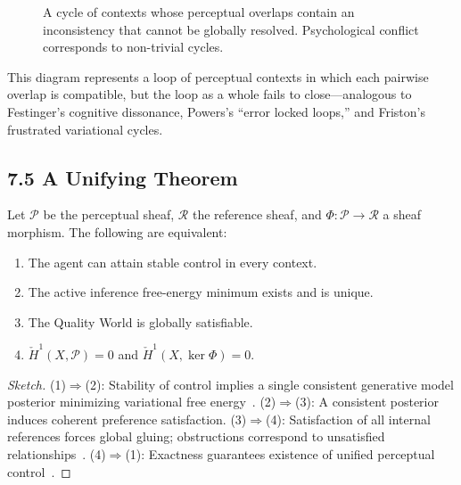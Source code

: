 \documentclass[11pt,a4paper,twoside]{article}
\begin{document}
\begin{figure}[h]
\centering
{}
\caption{A cycle of contexts whose perceptual overlaps contain an inconsistency that cannot be globally resolved. Psychological conflict corresponds to non-trivial cycles.}
\end{figure}

This diagram represents a loop of perceptual contexts in which each pairwise overlap is compatible, but the loop as a whole fails to close---analogous to Festinger’s cognitive dissonance, Powers’s ``error locked loops,'' and Friston’s frustrated variational cycles.

\subsection{7.5 A Unifying Theorem}

\begin{theorem}
Let $\mathcal{P}$ be the perceptual sheaf, $\mathcal{R}$ the reference sheaf, and $\Phi:\mathcal{P}\to\mathcal{R}$ a sheaf morphism. The following are equivalent:
\begin{enumerate}
\item The agent can attain stable control in every context.
\item The active inference free-energy minimum exists and is unique.
\item The Quality World is globally satisfiable.
\item $\check{H}^1(X,\mathcal{P})=0$ and $\check{H}^1(X,\ker\Phi)=0$.
\end{enumerate}
\end{theorem}

\begin{proof}[Sketch]
(1)$\Rightarrow$(2): Stability of control implies a single consistent generative model posterior minimizing variational free energy~\cite{friston2010free,bogacz2017}.
(2)$\Rightarrow$(3): A consistent posterior induces coherent preference satisfaction.
(3)$\Rightarrow$(4): Satisfaction of all internal references forces global gluing; obstructions correspond to unsatisfied relationships~\cite{glazebrook2022}.
(4)$\Rightarrow$(1): Exactness guarantees existence of unified perceptual control~\cite{curry2021sheafcomp,robinson2023sheaf}.
\end{proof}
\end{document}
